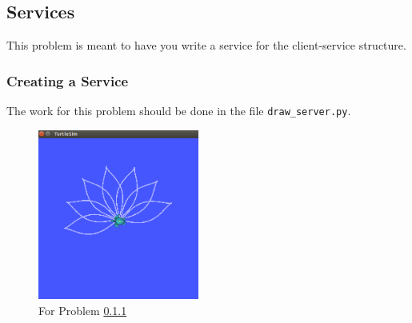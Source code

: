 \subsection{Services}

This problem is meant to have you write a service for the client-service structure. %

\subsubsection{Creating a Service}\label{p:service1}

The work for this problem should be done in the file \texttt{draw\_server.py}.

\begin{figure}[h]
  \centering
  \includegraphics[width=150pt]{figures/p1/problem4a.png}
  \caption{For Problem \ref{p:service1}}
  \label{fig:3}
\end{figure}


